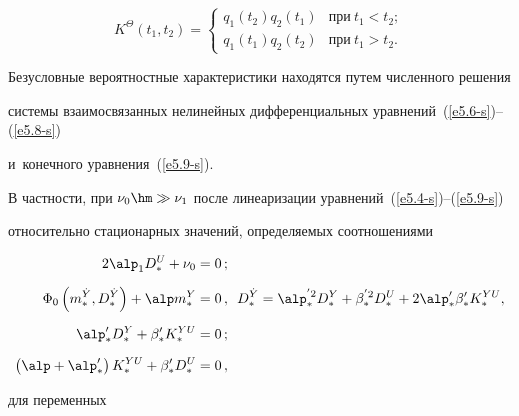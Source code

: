     \begin{equation}

     K^\Theta (t_1, t_2) =\begin{cases}

       q_1 (t_2) q_2 (t_1) & \mbox{при}\  t_1<t_2;\\[6pt]

        q_1 (t_1) q_2 (t_2) & \mbox{при}\  t_1>t_2.

        \end{cases}

\label{e5.11-s}

\end{equation}







Безусловные вероятностные характеристики находятся путем численного решения 

системы взаимосвязанных нелинейных дифференциальных уравнений~(\ref{e5.6-s})--(\ref{e5.8-s}) 

и~конечного уравнения~(\ref{e5.9-s}).





В частности, при $\nu_0 \hm\gg \nu_1$ после линеаризации уравнений~(\ref{e5.4-s})--(\ref{e5.9-s}) 

относительно стационарных значений, определяемых соотношениями

\begin{align*}

2 \alp_1 D_*^U + \nu_0 &=0\,; %

\\[6pt]

\Phi_0  \left( m_*^{\dot Y}, D_*^{\dot Y}\right) +\alp m_*^Y &=0\,,\enskip  

    D_*^{\dot Y}=\alp_*^{'2} D_*^Y +\beta_*^{'2} D_*^U+ 2\alp_*'\beta_*' K_*^{YU},%

 \\[6pt]

 \alp_*' D_*^Y + \beta_*' K_*^{YU} &=0\,;

\\[6pt]

  \left(\alp+\alp_*'\right) K_*^{YU} + \beta_*' D_*^U&=0\,,


     \end{align*}

для переменных 


